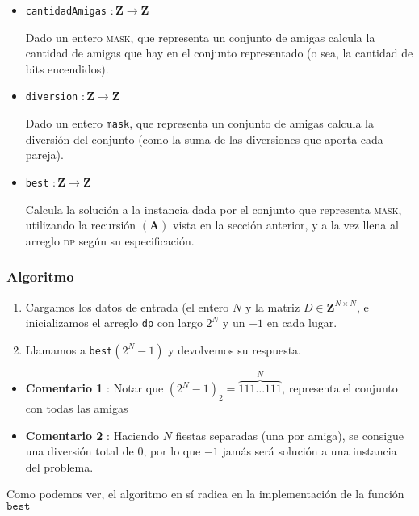 \begin{itemize}
	\item \texttt{cantidadAmigas} $ : \mathbf{Z} \rightarrow \mathbf{Z}$
	
	Dado un entero \textsc{mask}, que representa un conjunto de amigas calcula la cantidad de amigas que hay en el conjunto representado (o sea, la cantidad de bits encendidos).

	\item \texttt{diversion} $ : \mathbf{Z} \rightarrow \mathbf{Z}$
	
	Dado un entero \texttt{mask}, que representa un conjunto de amigas calcula la diversión del conjunto (como la suma de las diversiones que aporta cada pareja).
	
	\item \texttt{best} $ : \mathbf{Z} \rightarrow \mathbf{Z}$
	
	Calcula la solución a la instancia dada por el conjunto que representa \textsc{mask}, utilizando la recursión $(\mathbf{A})$ vista en la sección anterior, y a la vez llena al arreglo \textsc{dp} según su especificación.
\end{itemize}

\subsubsection*{Algoritmo}

\begin{enumerate}
	\item Cargamos los datos de entrada (el entero $N$ y la matriz $D \in \mathbf{Z}^{N \times N}$, e inicializamos el arreglo \texttt{dp} con largo $2^N$ y un $-1$ en cada lugar.
	\item Llamamos a \texttt{best}$(2^N - 1)$ y devolvemos su respuesta. 
\end{enumerate}

\begin{itemize}
	\item \textbf{Comentario 1} : Notar que $(2^N-1)_2 = \overset{N}{\overbrace{111\dots111}}$, representa el conjunto con todas las amigas
	\item \textbf{Comentario 2} : Haciendo $N$ fiestas separadas (una por amiga), se consigue una diversión total de $0$, por lo que $-1$ jamás será solución a una instancia del problema.
\end{itemize}

 
 Como podemos ver, el algoritmo en sí radica en la implementación de la función $\texttt{best}$

